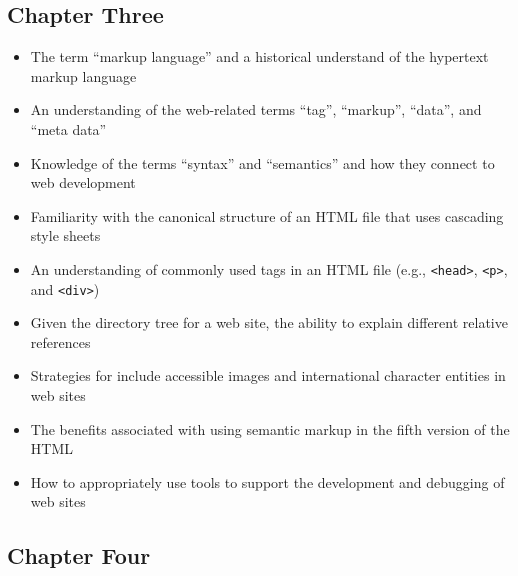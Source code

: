 \documentclass[11pt]{article}
\newcommand{\program}[1]{\lstinline{#1}}
\begin{document}
\vspace*{-.2in}
\subsection*{Chapter Three}

\begin{itemize}

  \itemsep 0in

  \item The term ``markup language'' and a historical understand of the
    hypertext markup language
  \item An understanding of the web-related terms ``tag'', ``markup'', ``data'',
    and ``meta data''
  \item Knowledge of the terms ``syntax'' and ``semantics'' and how they
    connect to web development
  \item Familiarity with the canonical structure of an HTML file that
    uses cascading style sheets
  \item An understanding of commonly used tags in an HTML file (e.g., \program{<head>},
    \program{<p>}, and \program{<div>})
  \item Given the directory tree for a web site, the ability to explain
    different relative references
  \item Strategies for include accessible images and international character
    entities in web sites
  \item The benefits associated with using semantic markup in the fifth version
    of the HTML
  \item How to appropriately use tools to support the development and
    debugging of web sites

\end{itemize}

\vspace*{-.2in}
\subsection*{Chapter Four}
\end{document}
